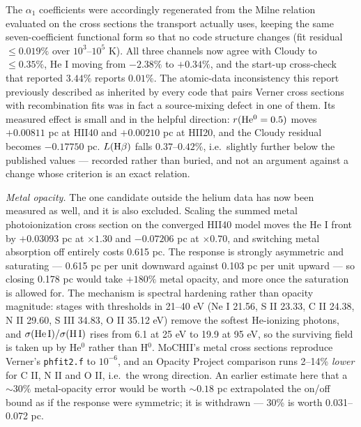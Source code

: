 \documentclass[11pt]{my_memo}
\begin{document}
The $\alpha_1$ coefficients were accordingly regenerated from the Milne relation evaluated on the cross sections the transport actually uses, keeping the same seven-coefficient functional form so that no code structure changes (fit residual $\le0.019\%$ over $10^3$--$10^5$ K).  All three channels now agree with Cloudy to $\le0.35\%$, He I moving from $-2.38\%$ to $+0.34\%$, and the start-up cross-check that reported $3.44\%$ reports $0.01\%$.  The atomic-data inconsistency this report previously described as inherited by every code that pairs Verner cross sections with recombination fits was in fact a source-mixing defect in one of them.  Its measured effect is small and in the helpful direction: $r({\rm He^0}=0.5)$ moves $+0.00811$ pc at HII40 and $+0.00210$ pc at HII20, and the Cloudy residual becomes $-0.17750$ pc.  $L({\rm H}\beta)$ falls $0.37$--$0.42\%$, i.e.\ slightly further below the published values --- recorded rather than buried, and not an argument against a change whose criterion is an exact relation.

\emph{Metal opacity.}  The one candidate outside the helium data has now been measured as well, and it is also excluded.  Scaling the summed metal photoionization cross section on the converged HII40 model moves the He I front by $+0.03093$ pc at $\times1.30$ and $-0.07206$ pc at $\times0.70$, and switching metal absorption off entirely costs 0.615 pc.  The response is strongly asymmetric and saturating --- 0.615 pc per unit downward against 0.103 pc per unit upward --- so closing 0.178 pc would take $+180\%$ metal opacity, and more once the saturation is allowed for.  The mechanism is spectral hardening rather than opacity magnitude: stages with thresholds in 21--40 eV (Ne I 21.56, S II 23.33, C II 24.38, N II 29.60, S III 34.83, O II 35.12 eV) remove the softest He-ionizing photons, and $\sigma({\rm He\,I})/\sigma({\rm H\,I})$ rises from 6.1 at 25 eV to 19.9 at 95 eV, so the surviving field is taken up by He$^0$ rather than H$^0$.  MoCHII's metal cross sections reproduce Verner's \texttt{phfit2.f} to $10^{-6}$, and an Opacity Project comparison runs 2--14\% \emph{lower} for C II, N II and O II, i.e.\ the wrong direction.  An earlier estimate here that a $\sim30\%$ metal-opacity error would be worth $\sim0.18$ pc extrapolated the on/off bound as if the response were symmetric; it is withdrawn --- 30\% is worth 0.031--0.072 pc.
\end{document}
